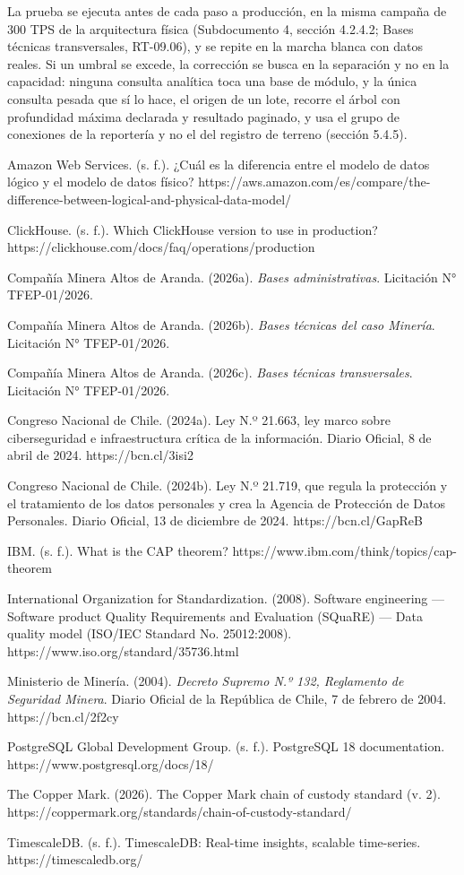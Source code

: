 \documentclass[subdoc]{../../comun/overfore}
\begin{document}
La prueba se ejecuta antes de cada paso a producción, en la misma campaña de 300 TPS de la arquitectura física (Subdocumento 4, sección 4.2.4.2; Bases técnicas transversales, RT-09.06), y se repite en la marcha blanca con datos reales. Si un umbral se excede, la corrección se busca en la separación y no en la capacidad: ninguna consulta analítica toca una base de módulo, y la única consulta pesada que sí lo hace, el origen de un lote, recorre el árbol con profundidad máxima declarada y resultado paginado, y usa el grupo de conexiones de la reportería y no el del registro de terreno (sección 5.4.5).

\begin{referencias}
\item Amazon Web Services. (s. f.). ¿Cuál es la diferencia entre el modelo de datos lógico y el modelo de datos físico? https://aws.amazon.com/es/compare/the-difference-between-logical-and-physical-data-model/
\item ClickHouse. (s. f.). Which ClickHouse version to use in production? https://clickhouse.com/docs/faq/operations/production
\item Compañía Minera Altos de Aranda. (2026a). \emph{Bases administrativas}. Licitación N° TFEP-01/2026.
\item Compañía Minera Altos de Aranda. (2026b). \emph{Bases técnicas del caso Minería}. Licitación N° TFEP-01/2026.
\item Compañía Minera Altos de Aranda. (2026c). \emph{Bases técnicas transversales}. Licitación N° TFEP-01/2026.
\item Congreso Nacional de Chile. (2024a). Ley N.º 21.663, ley marco sobre ciberseguridad e infraestructura crítica de la información. Diario Oficial, 8 de abril de 2024. https://bcn.cl/3isi2
\item Congreso Nacional de Chile. (2024b). Ley N.º 21.719, que regula la protección y el tratamiento de los datos personales y crea la Agencia de Protección de Datos Personales. Diario Oficial, 13 de diciembre de 2024. https://bcn.cl/GapReB
\item IBM. (s. f.). What is the CAP theorem? https://www.ibm.com/think/topics/cap-theorem
\item International Organization for Standardization. (2008). Software engineering — Software product Quality Requirements and Evaluation (SQuaRE) — Data quality model (ISO/IEC Standard No. 25012:2008). https://www.iso.org/standard/35736.html
\item Ministerio de Minería. (2004). \emph{Decreto Supremo N.º 132, Reglamento de Seguridad Minera}. Diario Oficial de la República de Chile, 7 de febrero de 2004. https://bcn.cl/2f2cy
\item PostgreSQL Global Development Group. (s. f.). PostgreSQL 18 documentation. https://www.postgresql.org/docs/18/
\item The Copper Mark. (2026). The Copper Mark chain of custody standard (v. 2). https://coppermark.org/standards/chain-of-custody-standard/
\item TimescaleDB. (s. f.). TimescaleDB: Real-time insights, scalable time-series. https://timescaledb.org/
\end{referencias}
\end{document}
